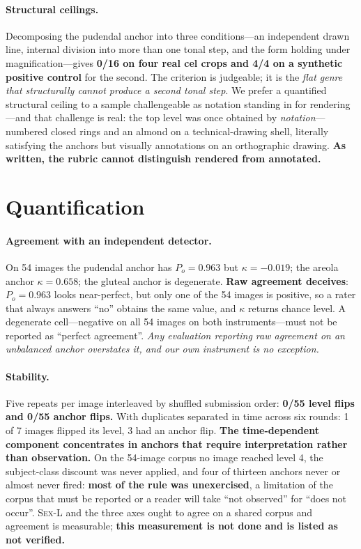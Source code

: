\documentclass[11pt]{article}
\newcommand{\sexl}{\textsc{Sex-L}}
\begin{document}
\paragraph{Structural ceilings.} Decomposing the pudendal anchor into three
conditions---an independent drawn line, internal division into more than one
tonal step, and the form holding under magnification---gives \textbf{0/16 on
four real cel crops and 4/4 on a synthetic positive control} for the second.
The criterion is judgeable; it is the \emph{flat genre that structurally cannot
produce a second tonal step}. We prefer a quantified structural ceiling to a
sample challengeable as notation standing in for rendering---and that challenge
is real: the top level was once obtained by \emph{notation}---numbered closed
rings and an almond on a technical-drawing shell, literally satisfying the
anchors but visually annotations on an orthographic drawing. \textbf{As
written, the rubric cannot distinguish rendered from annotated.}

\section{Quantification}
\label{sec:quant}

\paragraph{Agreement with an independent detector.} On 54 images the pudendal
anchor has $P_o=0.963$ but $\kappa=-0.019$; the areola anchor $\kappa=0.658$;
the gluteal anchor is degenerate. \textbf{Raw agreement deceives}: $P_o=0.963$
looks near-perfect, but only one of the 54 images is positive, so a rater that
always answers ``no'' obtains the same value, and $\kappa$ returns chance
level. A degenerate cell---negative on all 54 images on both instruments---must
not be reported as ``perfect agreement''. \emph{Any evaluation reporting raw
agreement on an unbalanced anchor overstates it, and our own instrument is no
exception.}

\paragraph{Stability.} Five repeats per image interleaved by shuffled
submission order: \textbf{0/55 level flips and 0/55 anchor flips.} With
duplicates separated in time across six rounds: 1 of 7 images flipped its level,
3 had an anchor flip. \textbf{The time-dependent component concentrates in
anchors that require interpretation rather than observation.} On the 54-image
corpus no image reached level 4, the subject-class discount was never applied,
and four of thirteen anchors never or almost never fired: \textbf{most of the
rule was unexercised}, a limitation of the corpus that must be reported or a
reader will take ``not observed'' for ``does not occur''. \sexl{} and the three
axes ought to agree on a shared corpus and agreement is measurable;
\textbf{this measurement is not done and is listed as not verified.}
\end{document}
